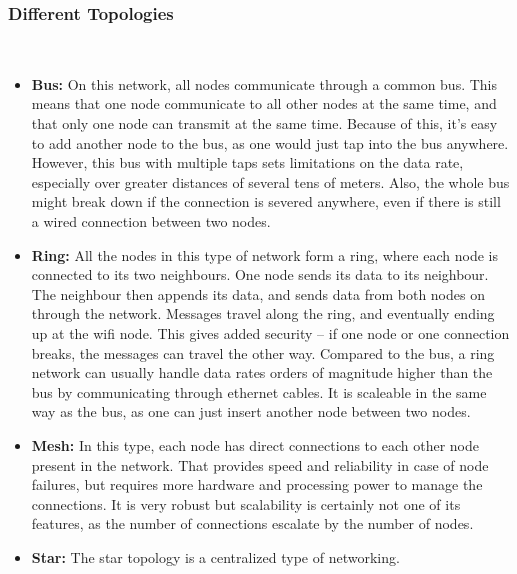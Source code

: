 \subsubsection{Different Topologies}~\\
\begin{itemize}
\item \textbf{Bus:}
On this network, all nodes communicate through a common bus. 
This means that one node communicate to all other nodes at the same time, and that only one node can transmit at the same time.
Because of this, it's easy to add another node to the bus, as one would just tap into the bus anywhere.
However, this bus with multiple taps sets limitations on the data rate, especially over greater distances of several tens of meters.
Also, the whole bus might break down if the connection is severed anywhere, even if there is still a wired connection between two nodes.
\item \textbf{Ring:} All the nodes in this type of network form a ring, where each node is connected to its two neighbours.
One node sends its data to its neighbour. The neighbour then appends its data, and sends data from both nodes on through the network. 
Messages travel along the ring, and eventually ending up at the wifi node.
This gives added security -- if one node or one connection breaks, the messages can travel the other way. 
Compared to the bus, a ring network can usually handle data rates orders of magnitude higher than the bus by communicating through ethernet cables. 
It is scaleable in the same way as the bus, as one can just insert another node between two nodes.
\item \textbf{Mesh:} In this type, each node has direct connections to each other node present in the network.
That provides speed and reliability in case of node failures, but requires more hardware and processing power to manage the connections.
It is very robust but scalability is certainly not one of its features, as the number of connections escalate by the number of nodes.
\item \textbf{Star:} The star topology is a centralized type of networking.

\end{itemize}
